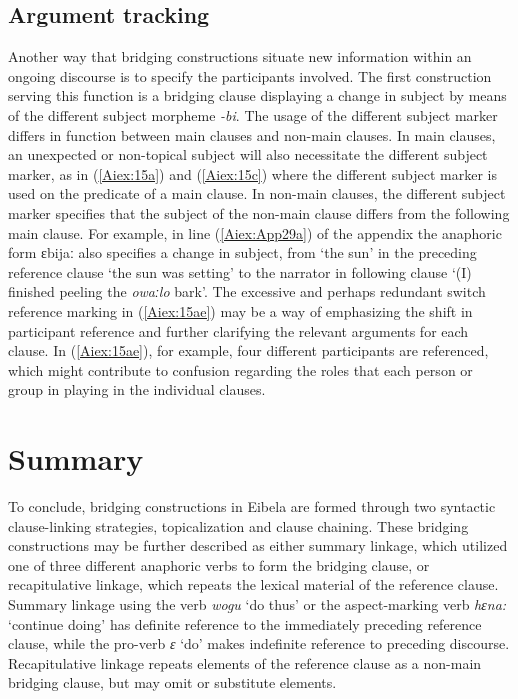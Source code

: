 \documentclass[output=paper]{LSP/langsci}
\begin{document}
\subsection{Argument tracking} 
\label{Aitracking}
Another way that bridging constructions situate new information within an ongoing discourse is to specify the participants involved. The first construction serving this function is a bridging clause displaying a change in subject by means of the different subject morpheme \textit{-bi}. The usage of the different subject marker differs in function between main clauses and non-main clauses. In main clauses, an unexpected or non-topical subject will also necessitate the different subject marker, as in (\ref{Aiex:15a}) and (\ref{Aiex:15c}) where the different subject marker is used on the predicate of a main clause. In non-main clauses, the different subject marker specifies that the subject of the non-main clause differs from the following main clause. For example, in line (\ref{Aiex:App29a}) of the appendix the anaphoric form ɛbijaː also specifies a change in subject, from `the sun' in the preceding reference clause `the sun was setting' to the narrator in following clause `(I) finished peeling the \textit{owaːlo} bark'. The excessive and perhaps redundant switch reference marking in (\ref{Aiex:15ae}) may be a way of emphasizing the shift in participant reference and further clarifying the relevant arguments for each clause. In (\ref{Aiex:15ae}), for example, four different participants are referenced, which might contribute to confusion regarding the roles that each person or group in playing in the individual clauses.

\section{Summary} 
\label{AiSumm}
To conclude, bridging constructions in Eibela are formed through two syntactic clause-linking strategies, topicalization and clause chaining. These bridging constructions may be further described as either summary linkage, which utilized one of three different anaphoric verbs to form the bridging clause, or recapitulative linkage, which repeats the lexical material of the reference clause. Summary linkage using the verb \textit{wogu} `do thus' or the aspect-marking verb \textit{hɛna:} `continue doing' has definite reference to the immediately preceding reference clause, while the pro-verb \textit{ɛ} `do' makes indefinite reference to preceding discourse. Recapitulative linkage repeats elements of the reference clause as a non-main bridging clause, but may omit or substitute elements. 
\end{document}
